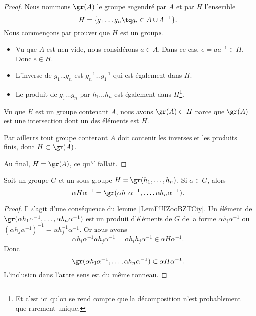 \begin{proof}
    Nous nommons \( \gr(A)\) le groupe engendré par \( A\) et par \( H\) l'ensemble
    \begin{equation}
        H=\{ g_1\ldots g_n\tq g_i\in A\cup A^{-1} \}.
    \end{equation}
    Nous commençons par prouver que \( H\) est un groupe.
    \begin{itemize}
        \item Vu que \( A\) est non vide, nous considérons \( a\in A\). Dans ce cas, \( e=aa^{-1}\in H\). Donc \( e\in H\).
        \item L'inverse de \( g_1\ldots g_n\) est \( g_n^{-1}\ldots g_1^{-1}\) qui est également dans \( H\).
        \item Le produit de \( g_1\ldots g_n\) par \( h_1\ldots h_n\) est également dans \( H\)\footnote{Et c'est ici qu'on se rend compte que la décomposition n'est probablement que rarement unique.}.
    \end{itemize}
    Vu que \( H\) est un groupe contenant \( A\), nous avons \( \gr(A)\subset H\) parce que \( \gr(A)\) est une intersection dont un des éléments est \( H\).

    Par ailleurs tout groupe contenant \( A\) doit contenir les inverses et les produits finis, donc \( H\subset \gr(A)\).

    Au final, \( H=\gr(A)\), ce qu'il fallait.
\end{proof}

\begin{lemma}       \label{LEMooCFTVooKvmyKN}
    Soit un groupe \( G\) et un sous-groupe \( H=\gr(h_1,\ldots, h_n)\). Si \( \alpha\in G\), alors
    \begin{equation}
        \alpha H\alpha^{-1}=\gr(\alpha h_1\alpha^{-1},\ldots, \alpha h_n\alpha^{-1}).
    \end{equation}
\end{lemma}

\begin{proof}
    Il s'agit d'une conséquence du lemme \ref{LemFUIZooBZTCiy}. Un élément de \( \gr(\alpha h_1\alpha^{-1},\ldots, \alpha h_n\alpha^{-1})\) est un produit d'éléments de \( G\) de la forme \( \alpha h_i\alpha^{-1}\) ou \( (\alpha h_j\alpha^{-1})^{-1}=\alpha h_j^{-1}\alpha^{-1}\). Or nous avons
    \begin{equation}
        \alpha h_i\alpha^{-1}\alpha h_j\alpha^{-1}=\alpha h_ih_j\alpha^{-1}\in \alpha H\alpha^{-1}.
    \end{equation}
    Donc 
    \begin{equation}
        \gr(\alpha h_1\alpha^{-1},\ldots, \alpha h_n\alpha^{-1})\subset \alpha H\alpha^{-1}.
    \end{equation}
    L'inclusion dans l'autre sens est du même tonneau.
\end{proof}

